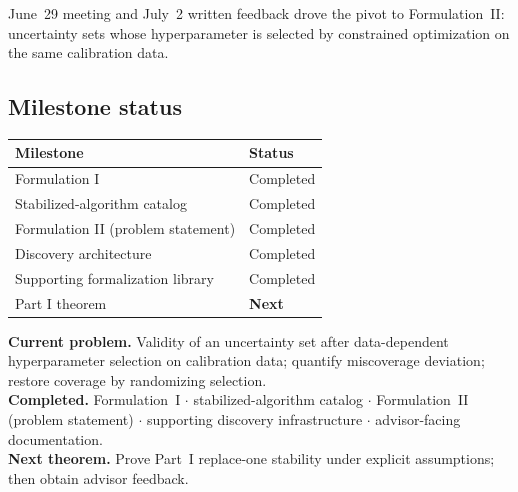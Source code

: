 \documentclass[11pt]{article}
\begin{document}
\vspace{1pt}
\noindent June~29 meeting and July~2 written feedback drove the pivot to Formulation~II:
uncertainty sets whose hyperparameter is selected by constrained optimization on the
same calibration data.

\vspace{1pt}
\subsection*{Milestone status}
\renewcommand{\arraystretch}{1.02}
\begin{tabularx}{\textwidth}{@{}>{\RaggedRight\arraybackslash}X >{\centering\arraybackslash}p{2.0cm}@{}}
\toprule
\textbf{Milestone} & \textbf{Status} \\
\midrule
\rowcolor{bluegray}
Formulation I & Completed \\
Stabilized-algorithm catalog & Completed \\
\rowcolor{bluegray}
Formulation II (problem statement) & Completed \\
Discovery architecture & Completed \\
\rowcolor{bluegray}
Supporting formalization library & Completed \\
Part I theorem & \textbf{Next} \\
\bottomrule
\end{tabularx}

\vspace{2pt}
\begin{tcolorbox}[minipanel]
\textbf{\color{navy}Current problem.}
Validity of an uncertainty set after data-dependent hyperparameter selection on calibration data;
quantify miscoverage deviation; restore coverage by randomizing selection.\\[1pt]
\textbf{\color{navy}Completed.}
Formulation~I $\cdot$
stabilized-algorithm catalog $\cdot$
Formulation~II (problem statement) $\cdot$
supporting discovery infrastructure $\cdot$
advisor-facing documentation.\\[1pt]
\textbf{\color{navy}Next theorem.}
Prove Part~I replace-one stability under explicit assumptions; then obtain advisor feedback.
\end{tcolorbox}

\vspace{2pt}
\end{document}
